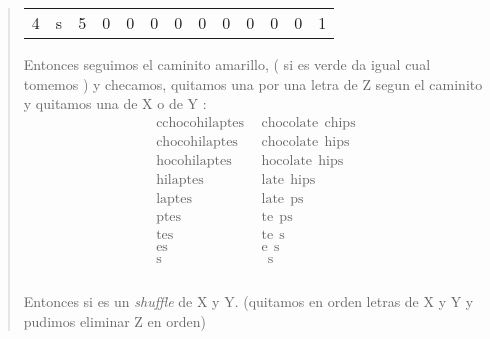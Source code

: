 \begin{quote}
\begin{table}[H]
\begin{tabular}{lllllllllllll}
          4 & s & \multicolumn{1}{l|}{5} & \multicolumn{1}{l|}{0}                         & \multicolumn{1}{l|}{0}                         & \multicolumn{1}{l|}{0}                         & \multicolumn{1}{l|}{0}                         & \multicolumn{1}{l|}{0}                         & \multicolumn{1}{l|}{0}                         & \multicolumn{1}{l|}{0}                         & \multicolumn{1}{l|}{0}                         & \multicolumn{1}{l|}{0}                         & \multicolumn{1}{l|}{\cellcolor[HTML]{FFFC9E}1} \\ \cline{4-13} 
          \end{tabular}
    \end{table}

    Entonces seguimos el caminito amarillo, ( si es verde da igual cual tomemos ) y checamos, quitamos una por una letra de Z segun el caminito y quitamos una de X o de Y :
    \begin{align*}
        \text{cchocohilaptes} &\ \ \text{chocolate} \ \ \text{chips} \\
        \text{chocohilaptes} &\ \ \text{chocolate} \ \ \text{hips} \\
        \text{hocohilaptes} &\ \ \text{hocolate} \ \ \text{hips} \\
        \text{hilaptes} &\ \ \text{late} \ \ \text{hips} \\
        \text{laptes} &\ \ \text{late} \ \ \text{ps} \\
        \text{ptes} &\ \ \text{te} \ \ \text{ps} \\
        \text{tes} &\ \ \text{te} \ \ \text{s} \\
        \text{es} &\ \ \text{e} \ \ \text{s} \\
        \text{s} &\ \ \text{} \ \ \text{s} \\
        \text{} &\ \ \text{} \ \ \text{} \\
    \end{align*}
    \vspace{-1.6cm}

    Entonces si es un \textit{shuffle} de X y Y. (quitamos en orden letras de X y Y y pudimos eliminar Z en orden)\vspace{.2cm}
\end{quote}

